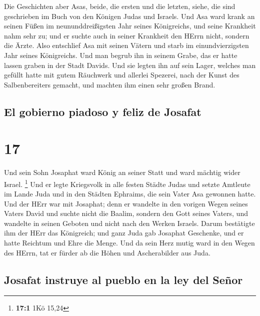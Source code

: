  Die Geschichten aber Asas, beide, die ersten und die
letzten, siehe, die sind geschrieben im Buch von den Königen Judas und
Israels.  Und Asa ward krank an seinen Füßen im
neununddreißigsten Jahr seines Königreichs, und seine Krankheit nahm
sehr zu; und er suchte auch in seiner Krankheit den HErrn nicht, sondern
die Ärzte.  Also entschlief Asa mit seinen Vätern und
starb im einundvierzigsten Jahr seines Königreichs.  Und
man begrub ihn in seinem Grabe, das er hatte lassen graben in der Stadt
Davids. Und sie legten ihn auf sein Lager, welches man gefüllt hatte mit
gutem Räuchwerk und allerlei Spezerei, nach der Kunst des
Salbenbereiters gemacht, und machten ihm einen sehr großen Brand.

\hypertarget{el-gobierno-piadoso-y-feliz-de-josafat}{%
\subsection{El gobierno piadoso y feliz de
Josafat}\label{el-gobierno-piadoso-y-feliz-de-josafat}}

\hypertarget{section-16}{%
\section{17}\label{section-16}}

 Und sein Sohn Josaphat ward König an seiner Statt und
ward mächtig wider Israel. \footnote{\textbf{17:1} 1Kö 15,24}
 Und er legte Kriegsvolk in alle festen Städte Judas und
setzte Amtleute im Lande Juda und in den Städten Ephraims, die sein
Vater Asa gewonnen hatte.  Und der HErr war mit Josaphat;
denn er wandelte in den vorigen Wegen seines Vaters David und suchte
nicht die Baalim,  sondern den Gott seines Vaters, und
wandelte in seinen Geboten und nicht nach den Werken Israels.
 Darum bestätigte ihm der HErr das Königreich; und ganz
Juda gab Josaphat Geschenke, und er hatte Reichtum und Ehre die Menge.
 Und da sein Herz mutig ward in den Wegen des HErrn, tat
er fürder ab die Höhen und Ascherabilder aus Juda.

\hypertarget{josafat-instruye-al-pueblo-en-la-ley-del-seuxf1or}{%
\subsection{Josafat instruye al pueblo en la ley del
Señor}\label{josafat-instruye-al-pueblo-en-la-ley-del-seuxf1or}}

